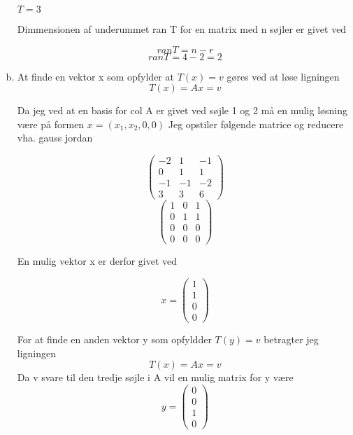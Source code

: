\documentclass[12pt]{article}
\begin{document}
\begin{enumerate}[(a)]
$T = 3$

Dimmensionen af underummet ran T for en matrix med n søjler er givet ved

$$ran T = n-r$$
$$ran T = 4-2 = 2$$

\item 
At finde en vektor x som opfylder at $T(x) = v$ gøres ved at løse ligningen
$$T(x) = Ax = v$$

Da jeg ved at en basis for col A er givet ved søjle 1 og 2 må en mulig
løsning være på formen $x = (x_1, x_2 , 0, 0)$
Jeg opstiler følgende matrice og reducere vha. gauss jordan

$$
\left(\begin{array}{cc|c}
-2&1&-1\\
0&1&1\\
-1&-1&-2\\
3&3&6
\end{array}\right)
$$
$$
\left(\begin{array}{cc|c}
1&0&1\\
0&1&1\\
0&0&0\\
0&0&0
\end{array}\right)
$$

En mulig vektor x er derfor givet ved 

$$
x = \left(\begin{array}{cc|c}
1\\
1\\
0\\
0
\end{array}\right)
$$

For at finde en anden vektor y som opfyldder $T(y) = v$ betragter jeg ligningen
$$T(x) = Ax = v$$
Da v svare til den tredje søjle i A vil en mulig matrix for y være
$$ 
y = \left(\begin{array}{cc|c}
0\\
0\\
1\\
0
\end{array}\right)
$$


\end{enumerate}
\end{document}
